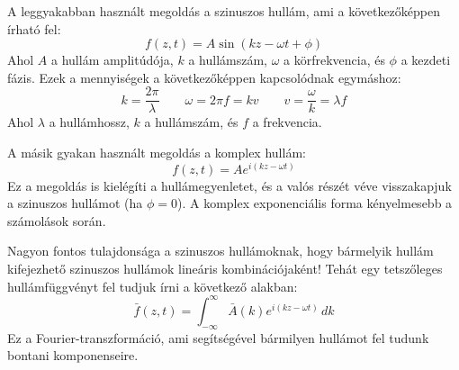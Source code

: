 \documentclass[../main.tex]{subfiles}
\begin{document}
A leggyakabban használt megoldás a szinuszos hullám, ami a következőképpen írható fel:
\begin{equation}
    f(z, t) = A \sin(kz - \omega t + \phi)
\end{equation}
Ahol $A$ a hullám amplitúdója, $k$ a hullámszám, $\omega$ a körfrekvencia, és $\phi$ a kezdeti fázis. Ezek a mennyiségek a következőképpen kapcsolódnak egymáshoz:
\begin{equation}
    k = \frac{2 \pi}{\lambda} \qquad \omega = 2 \pi f = kv \qquad v = \frac{\omega}{k} = \lambda f
\end{equation}
Ahol $\lambda$ a hullámhossz, $k$ a hullámszám, és $f$ a frekvencia.

A másik gyakan használt megoldás a komplex hullám:
\begin{equation}
    f(z, t) = A e^{i(kz - \omega t)}
\end{equation}
Ez a megoldás is kielégíti a hullámegyenletet, és a valós részét véve visszakapjuk a szinuszos hullámot (ha $\phi = 0$). A komplex exponenciális forma kényelmesebb a számolások során.

Nagyon fontos tulajdonsága a szinuszos hullámoknak, hogy bármelyik hullám kifejezhető szinuszos hullámok lineáris kombinációjaként! Tehát egy tetszőleges hullámfüggvényt fel tudjuk írni a következő alakban:
\begin{equation}
    \bar{f}(z, t) = \int_{-\infty}^{\infty} \bar{A}(k) e^{i(kz - \omega t)} \, dk
\end{equation}
Ez a Fourier-transzformáció, ami segítségével bármilyen hullámot fel tudunk bontani komponenseire.
\end{document}

